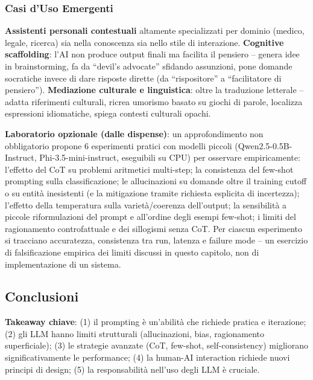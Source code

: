 \documentclass[12pt,a4paper]{article}
\begin{document}
\subsubsection{Casi d'Uso Emergenti}

\textbf{Assistenti personali contestuali} altamente specializzati per dominio (medico, legale, ricerca) sia nella conoscenza sia nello stile di interazione. \textbf{Cognitive scaffolding}: l'AI non produce output finali ma facilita il pensiero -- genera idee in brainstorming, fa da ``devil's advocate'' sfidando assunzioni, pone domande socratiche invece di dare risposte dirette (da ``rispositore'' a ``facilitatore di pensiero''). \textbf{Mediazione culturale e linguistica}: oltre la traduzione letterale -- adatta riferimenti culturali, ricrea umorismo basato su giochi di parole, localizza espressioni idiomatiche, spiega contesti culturali opachi.

\begin{quizbox}
\textbf{Laboratorio opzionale (dalle dispense)}: un approfondimento non obbligatorio propone 6 esperimenti pratici con modelli piccoli (Qwen2.5-0.5B-Instruct, Phi-3.5-mini-instruct, eseguibili su CPU) per osservare empiricamente: l'effetto del CoT su problemi aritmetici multi-step; la consistenza del few-shot prompting sulla classificazione; le allucinazioni su domande oltre il training cutoff o su entit\`a inesistenti (e la mitigazione tramite richiesta esplicita di incertezza); l'effetto della temperatura sulla variet\`a/coerenza dell'output; la sensibilit\`a a piccole riformulazioni del prompt e all'ordine degli esempi few-shot; i limiti del ragionamento controfattuale e dei sillogismi senza CoT. Per ciascun esperimento si tracciano accuratezza, consistenza tra run, latenza e failure mode -- un esercizio di falsificazione empirica dei limiti discussi in questo capitolo, non di implementazione di un sistema.
\end{quizbox}

\subsection{Conclusioni}

\textbf{Takeaway chiave}: (1) il prompting \`e un'abilit\`a che richiede pratica e iterazione; (2) gli LLM hanno limiti strutturali (allucinazioni, bias, ragionamento superficiale); (3) le strategie avanzate (CoT, few-shot, self-consistency) migliorano significativamente le performance; (4) la human-AI interaction richiede nuovi principi di design; (5) la responsabilit\`a nell'uso degli LLM \`e cruciale.
\end{document}
